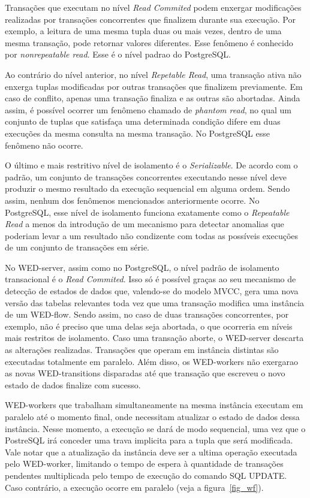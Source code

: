 \documentclass[conference]{IEEEtran}
\begin{document}
\par Transações que executam no nível \emph{Read Commited} podem enxergar modificações realizadas por transações concorrentes
que finalizem durante sua execução. Por exemplo, a leitura de uma mesma tupla duas ou mais vezes, dentro de uma mesma transação,
pode retornar valores diferentes. Esse fenômeno é conhecido por \emph{nonrepeatable read}. Esse é o nível padrao do PostgreSQL.

\par Ao contrário do nível anterior, no nível \emph{Repetable Read}, uma transação ativa não enxerga tuplas modificadas
por outras transações que finalizem previamente. Em caso de conflito, apenas uma transação finaliza e as outras são abortadas.
Ainda assim, é possível ocorrer um fenômeno chamado de \emph{phantom read}, no qual um conjunto de tuplas que satisfaça uma
determinada condição difere em duas execuções da mesma consulta na mesma transação. No PostgreSQL esse fenômeno não ocorre.

\par O último e mais restritivo nível de isolamento é o \emph{Serializable}. De acordo com o padrão, um conjunto de transações
concorrentes executando nesse nível deve produzir o mesmo resultado da execução sequencial em alguma ordem. Sendo assim, nenhum
dos fenômenos mencionados anteriormente ocorre. No PostgreSQL, esse nível de isolamento funciona exatamente como o \emph{Repeatable Read}
a menos da introdução de um mecanismo para detectar anomalias que poderiam levar a um resultado não condizente com todas
as possíveis execuções de um conjunto de transações em série.

\par No WED-server, assim como no PostgreSQL, o nível padrão de isolamento transacional é o \emph{Read Commited}. Isso só
é possível graças ao seu mecanismo de detecção de estados de dados que, valendo-se do modelo MVCC, gera uma nova versão das
tabelas relevantes toda vez que uma transação modifica uma instância de um WED-flow. Sendo assim, no caso de duas transações 
concorrentes, por exemplo, não é preciso que uma delas seja abortada, o que ocorreria em níveis mais restritos de isolamento.
Caso uma transação aborte, o WED-server descarta as alterações realizadas. Transações que operam em instância distintas 
são executadas totalmente em paralelo. Além disso, os WED-workers não exergarao as novas WED-transitions 
disparadas até que transação que escreveu o novo estado de dados finalize com sucesso.

\par WED-workers que trabalham simultaneamente na mesma instância executam em paralelo até o momento final, onde necessitam
atualizar o estado de dados dessa instância. Nesse momento, a execução se dará de modo sequencial, uma vez que o PostreSQL
irá conceder uma trava implicita para a tupla que será modificada. Vale notar que a atualização da instância deve ser a 
ultima operação executada pelo WED-worker, limitando o tempo de espera à quantidade de transações pendentes multiplicada 
pelo tempo de execução do comando SQL UPDATE. Caso contrário, a execução ocorre em paralelo (veja a figura~\ref{fig_wf}).
   
\end{document}
